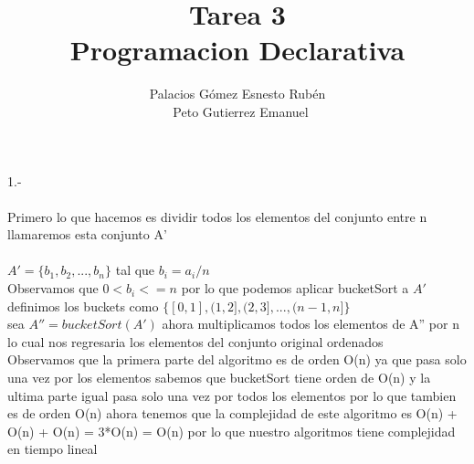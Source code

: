 \documentclass{article}
\title{Tarea 3 \\ Programacion Declarativa}
\author{Palacios Gómez Esnesto Rubén \\ \ Peto Gutierrez Emanuel}
\begin{document}
	\maketitle
	\begin{flushleft}
	1.-  \\ \ \\
	Primero lo que hacemos es dividir todos los elementos del conjunto entre n llamaremos esta conjunto A' \\ \ \\
          $  A ' =\{ b_{1} ,b_{2} , ... , b_{n} \}$ tal que  $b_{i} = a_{i}/n$ \\ 
          Observamos que $ 0 < b_{i} <= n$ por lo que podemos aplicar bucketSort  a $A'$
	definimos los buckets como $\{[0 , 1] , (1 , 2] , (2 , 3] , ... , (n-1 , n]\} $\\
          sea $A'' = bucketSort (A') $ ahora multiplicamos todos los elementos de A'' por n lo cual nos regresaria los elementos del conjunto original ordenados\\
     	Observamos que la primera parte del algoritmo es de orden O(n) ya que pasa solo una vez por los elementos
          sabemos que bucketSort tiene orden de O(n) y la ultima parte igual pasa solo una vez por todos los elementos por lo que tambien es de orden O(n) ahora tenemos que 
	la complejidad de este algoritmo es O(n) + O(n) + O(n) = 3*O(n) = O(n) por lo que nuestro algoritmos tiene complejidad en tiempo  lineal


\end{flushleft}
\end{document}
